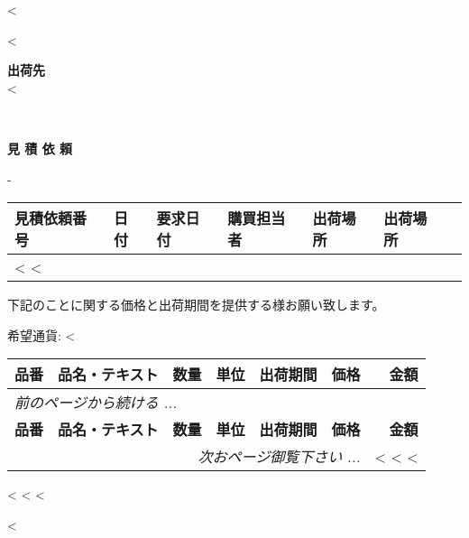 <%

\begin{CJK}{UTF8}{arialuni}

\vspace*{-3.3cm}
<%
\vspace{0.5cm}

\parbox[t]{.80\textwidth}{
\textbf{出荷先} \\
<%
}

\hfill \\

\vspace{0.5cm}

\centerline{\large\bf{見 積 依 頼}}
\normalsize

\vspace{0.5cm}
-
\vspace{0.2cm}

\begin{tabularx}{\textwidth}{*{7}{|X}|} \hline
  \textbf{見積依頼番号} & \textbf{日付} & \textbf{要求日付} & \textbf{購買担当者}
  & \textbf{出荷場所} & \textbf{出荷場所} \\ [0.5em]
  \hline
  <%
  <%
  \hline
\end{tabularx}

\parbox{\textwidth}{
\vspace{1.0cm}
下記のことに関する価格と出荷期間を提供する様お願い致します。
}

\vspace{0.5cm}
	希望通貨: <%
\vspace{0.5cm}

\begin{longtable}{|l p{5.5cm} @{\extracolsep\fill} rclrr|} \hline
  \textbf{品番} & \textbf{品名・テキスト} & \textbf{数量} & \textbf{単位}  & \textbf{出荷期間} & \textbf{価格} & \textbf{金額} \\     
  \hline
\endfirsthead
  \multicolumn{6}{l}{\emph{前のページから続ける ...}} \\
  \hline
  \textbf{品番} & \textbf{品名・テキスト} & \textbf{数量} & \textbf{単位}  & \textbf{出荷期間} & \textbf{価格} & \textbf{金額} \\     
  \hline
\endhead
   \hline \multicolumn{6}{r}{\emph{次おページ御覧下さい ...}}
\endfoot
   \hline
\endlastfoot
<%
  <%
  <%
		& <%
	<%
<%
\end{longtable}

\parbox{\textwidth}{
\vspace{0.5cm}
<%
  <%
<%
}

\vfill
<%
\end{CJK}

